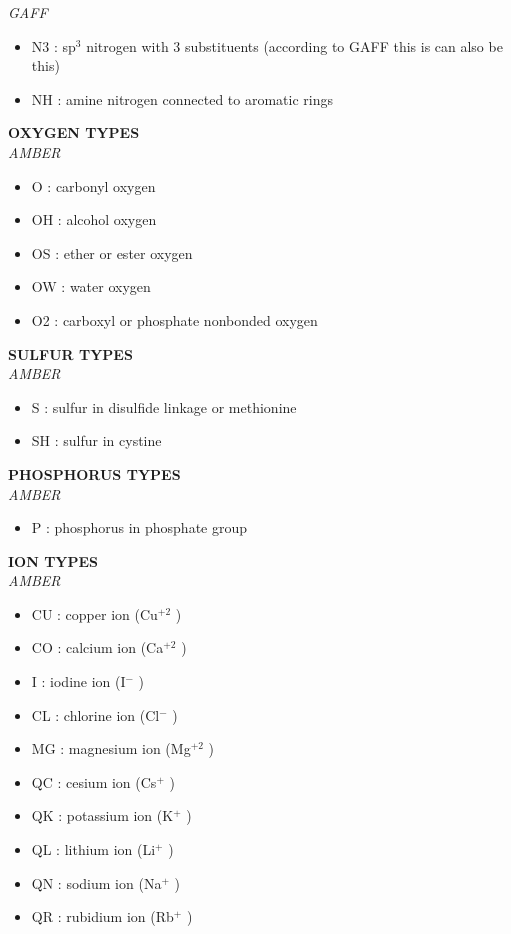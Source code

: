 \documentclass[a4paper]{article}
\begin{document}
\hspace{3mm}\textit{\small GAFF}
\begin{itemize}
    \item N3 : sp$^3$ nitrogen with 3 substituents (according to GAFF this is can also be this)
    \item NH : amine nitrogen connected to aromatic rings
\end{itemize}
\vspace{3mm}
%
%
%
\textbf{\normalsize OXYGEN TYPES}\\
\hspace{3mm}\textit{\small AMBER}
\begin{itemize}
    \item O : carbonyl oxygen 
    \item OH : alcohol oxygen 
    \item OS : ether or ester oxygen 
    \item OW : water oxygen 
    \item O2 : carboxyl or phosphate nonbonded oxygen 
\end{itemize}
\vspace{3mm}
%
%
%
\textbf{\normalsize SULFUR TYPES}\\
\hspace{3mm}\textit{\small AMBER}
\begin{itemize}
    \item S : sulfur in disulfide linkage or methionine 
    \item SH : sulfur in cystine
\end{itemize}
\vspace{3mm}
%
%
%
\textbf{\normalsize PHOSPHORUS TYPES}\\
\hspace{3mm}\textit{\small AMBER}
\begin{itemize}
    \item P : phosphorus in phosphate group 
\end{itemize}
\vspace{3mm}
%
%
%
\textbf{\normalsize ION TYPES}\\
\hspace{3mm}\textit{\small AMBER}
\begin{itemize}
    \item CU : copper ion (Cu$^{+2}$ ) 
    \item CO : calcium ion (Ca$^{+2}$ ) 
    \item I : iodine ion (I$^-$ ) 
    \item CL : chlorine ion (Cl$^-$ ) 
    \item MG : magnesium ion (Mg$^{+2}$ ) 
    \item QC : cesium ion (Cs$^+$ ) 
    \item QK : potassium ion (K$^+$ ) 
    \item QL : lithium ion (Li$^+$ ) 
    \item QN : sodium ion (Na$^+$ ) 
    \item QR : rubidium ion (Rb$^+$ ) 
\end{itemize}
\end{document}
